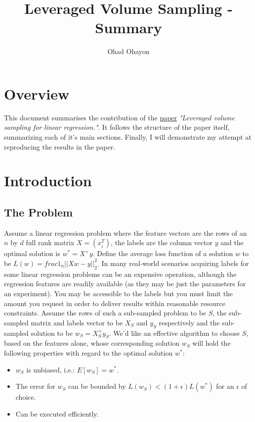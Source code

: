 \documentclass{article}
\begin{document}
	\title{Leveraged Volume Sampling - Summary}
	\author{Ohad Ohayon}
	\maketitle
	\newpage


    \tableofcontents
    \newpage

    \section{Overview}
        This document summarises the contribution of the {\color{blue}\href{https://arxiv.org/abs/1802.06749}{\underline{paper}}} \textit{"Leveraged volume sampling for linear regression."}.
        It follows the structure of the paper itself, summarizing each of it's main sections.
        Finally, I will demonstrate my attempt at reproducing the results in the paper.

    \section{Introduction}
        \subsection{The Problem}
            Assume a linear regression problem where the feature vectors are the rows of an $n$ by $d$ full rank matrix $X=(x_{i}^T)$,
            the labels are the column vector $y$ and the optimal solution is $w^\ast=X^+y$.
            Define the average loss function of a solution $w$ to be $L(w)=frac{1}_{n}||Xw-y||_{2}^2$.
            In many real-world scenarios acquiring labels for some linear regression problems can be an expensive operation,
            although the regression features are readily available (as they may be just the parameters for an experiment).
            You may be accessible to the labels but you must limit the amount you request in order to deliver results within
            reasonable resource constraints.
            Assume the rows of such a sub-sampled problem to be $S$, the sub-sampled matrix and labels vector to be $X_{S}$
            and $y_{S}$ respectively and the sub-sampled solution to be $w_{S}=X_{S}^+y_{S}$.
            We'd like an effective algorithm to choose $S$, based on the features alone, whose corresponding solution $w_{S}$
            will hold the following properties with regard to the optimal solution $w^\ast$:
            \begin{itemize}
                \item $w_{S}$ is unbiased, i.e.: $E[w_{S}]=w^\ast$.
                \item The error for $w_{S}$ can be bounded by $L(w_{S}) < (1+\epsilon)L(w^\ast)$ for an $\epsilon$ of choice.
                \item Can be executed efficiently.
            \end{itemize}
\end{document}
